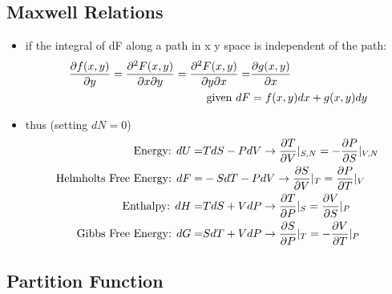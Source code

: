 \subsection*{Maxwell Relations}
\begin{itemize}
	\item if the integral of dF along a path in x y space is independent of the path:
	      \begin{align*}
		      \pdv{f(x,y)}{y} = \pdv{F(x,y)}{x}{y} = \pdv{F(x,y)}{y}{x} = & \pdv{g(x,y)}{x}       \\
		      \text{given } dF                                            & = f(x,y)dx + g(x,y)dy
	      \end{align*}
	\item thus (setting $dN = 0$)
	      \begin{align*}
		      \text{Energy: } dU =                & T dS - PdV \rightarrow \pdv{T}{V}|_{S,N} = - \pdv{P}{S}|_{V,N} \\
		      \text{Helmholts Free Energy: } dF = & -S dT - P dV \rightarrow \pdv{S}{V}|_T = \pdv{P}{T}|_V         \\
		      \text{Enthalpy: } dH =              & T dS + V dP \rightarrow \pdv{T}{P}|_S = \pdv{V}{S}|_P          \\
		      \text{Gibbs Free Energy: } dG =     & S dT + V dP  \rightarrow \pdv{S}{P}|_T = - \pdv{V}{T}|_P
	      \end{align*}

\end{itemize}

\subsection*{Partition Function}
